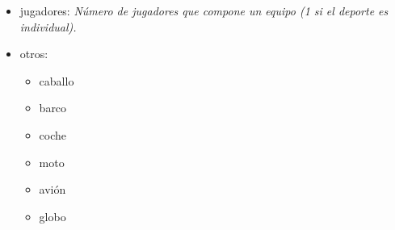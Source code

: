 \begin{itemize}
\item jugadores: \emph{Número de jugadores que compone un equipo (1 si el deporte es individual).}

\item otros:
	\begin{itemize}
	\item caballo
	\item barco
	\item coche
	\item moto
	\item avión
	\item globo
	\end{itemize}
\end{itemize}
% 
% 
% 
% 
% 
% 
% 
% 
